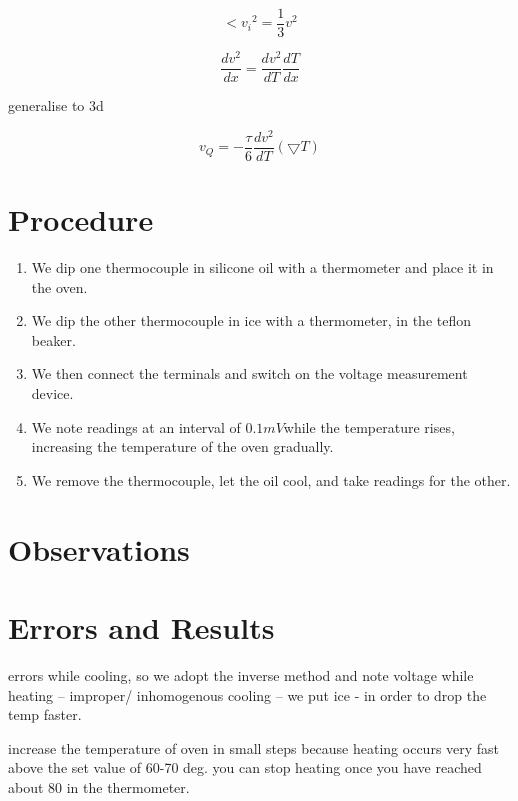\documentclass[12pt,a4paper]{article} %
\begin{document}
    \begin{equation*}
    <{v_i}^2 = \frac{1}{3}v^2
    \end{equation*}
    
    \begin{equation*}
    \frac{dv^2}{dx} = \frac{dv^2}{dT} \frac{dT}{dx}
    \end{equation*}
    
    generalise to 3d 
    
    \begin{equation*}
    v_Q = -\frac{\tau}{6} \frac{dv^2}{dT} (\bigtriangledown T ) 
    \end{equation*}
    
    
    \section{Procedure}
    \begin{enumerate}
    \item We dip one thermocouple in silicone oil with a thermometer and place it in the oven.
    \item We dip the other thermocouple in ice with a thermometer, in the teflon beaker.
    \item We then connect the terminals and switch on the voltage measurement device.
    \item We note readings at an interval of $ 0.1 mV $while the temperature rises, increasing the temperature of the oven gradually.
    \item We remove the thermocouple, let the oil cool, and take readings for the other. 
    \end{enumerate}
    
    \section{Observations}
    
    \section{Errors and Results}
    
    errors while cooling, so we adopt the inverse method and note voltage while heating -- improper/ inhomogenous cooling -- we put ice - in order to drop the temp faster.
    
    increase the temperature of oven in small steps because heating occurs very fast above the set value of 60-70 deg. you can stop heating once you have reached about 80 in the thermometer. 
    
    
        
\end{document}
